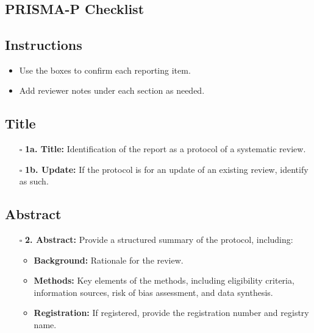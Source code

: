 \documentclass[11pt]{article}
\def\tightlist{}
\begin{document}
\begin{center}
{\LARGE }\\[4pt]
\normalsize 
\end{center}
\vspace{1em}

\begin{Form}

\section{PRISMA-P Checklist}\label{prisma-p-checklist}

\subsection{Instructions}\label{instructions}

\begin{itemize}
\tightlist
\item
  Use the boxes to confirm each reporting item.
\item
  Add reviewer notes under each section as needed.
\end{itemize}

\subsection{Title}\label{title}

\begin{itemize}
\tightlist
\item[$\square$]
  \textbf{1a. Title:} Identification of the report as a protocol of a
  systematic review.
\item[$\square$]
  \textbf{1b. Update:} If the protocol is for an update of an existing
  review, identify as such.
\end{itemize}

\subsection{Abstract}\label{abstract}

\begin{itemize}
\tightlist
\item[$\square$]
  \textbf{2. Abstract:} Provide a structured summary of the protocol,
  including:

  \begin{itemize}
  \tightlist
  \item
    \textbf{Background:} Rationale for the review.
  \item
    \textbf{Methods:} Key elements of the methods, including eligibility
    criteria, information sources, risk of bias assessment, and data
    synthesis.
  \item
    \textbf{Registration:} If registered, provide the registration
    number and registry name.
  \end{itemize}
\end{itemize}


\end{Form}
\end{document}
